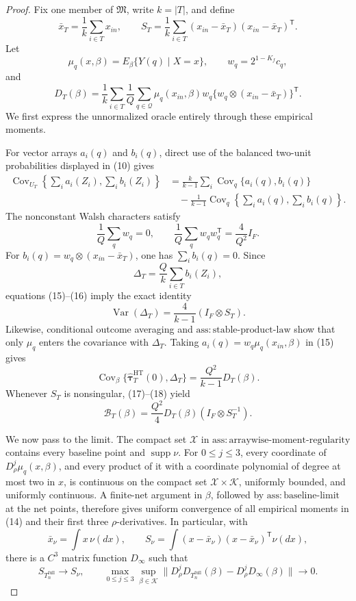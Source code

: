 \documentclass{article}
\begin{document}
\begin{proof}
Fix one member of \(\mathfrak M\), write \(k=|T|\), and define
\[
\bar x_T=\frac1k\sum_{i\in T}x_{in},
\qquad
S_T=\frac1k\sum_{i\in T}
(x_{in}-\bar x_T)(x_{in}-\bar x_T)^{\mathsf T}.
\]
Let
\[
\mu_q(x,\beta)=E_\beta\{Y(q)\mid X=x\},
\qquad w_q=2^{1-K_f}c_q,
\]
and
\[
D_T(\beta)
=\frac1k\sum_{i\in T}\frac1Q\sum_{q\in\mathcal Q}
\mu_q(x_{in},\beta)w_q
\{w_q\otimes(x_{in}-\bar x_T)\}^{\mathsf T}.
\tag{14}
\]
We first express the unnormalized oracle entirely through these empirical moments.

For vector arrays \(a_i(q)\) and \(b_i(q)\), direct use of the balanced two-unit probabilities displayed in (10) gives
\[
\begin{aligned}
\operatorname{Cov}_{U_T}\!\left\{\sum_i a_i(Z_i),\sum_i b_i(Z_i)\right\}
&=\frac{k}{k-1}\sum_i\operatorname{Cov}_q\{a_i(q),b_i(q)\}\\
&\quad-\frac1{k-1}
\operatorname{Cov}_q\!\left\{\sum_i a_i(q),\sum_i b_i(q)\right\}.
\end{aligned}
\tag{15}
\]
The nonconstant Walsh characters satisfy
\[
\frac1Q\sum_qw_q=0,
\qquad
\frac1Q\sum_qw_qw_q^{\mathsf T}=\frac4{Q^2}I_F.
\tag{16}
\]
For \(b_i(q)=w_q\otimes(x_{in}-\bar x_T)\), one has \(\sum_i b_i(q)=0\).  Since
\[
\Delta_T=\frac Qk\sum_{i\in T}b_i(Z_i),
\]
equations (15)--(16) imply the exact identity
\[
\operatorname{Var}(\Delta_T)
=\frac4{k-1}(I_F\otimes S_T).
\tag{17}
\]
Likewise, conditional outcome averaging and \(\mathrm{ass{:}stable\text{-}product\text{-}law}\) show that only \(\mu_q\) enters the covariance with \(\Delta_T\).  Taking \(a_i(q)=w_q\mu_q(x_{in},\beta)\) in (15) gives
\[
\operatorname{Cov}_\beta\{
\widehat{\boldsymbol\tau}^{\mathrm{HT}}_T(0),\Delta_T\}
=\frac{Q^2}{k-1}D_T(\beta).
\tag{18}
\]
Whenever \(S_T\) is nonsingular, (17)--(18) yield
\[
\mathcal B_T(\beta)
=\frac{Q^2}{4}D_T(\beta)(I_F\otimes S_T^{-1}).
\tag{19}
\]

We now pass to the limit.  The compact set \(\mathcal X\) in
\(\mathrm{ass{:}arraywise\text{-}moment\text{-}regularity}\) contains every baseline point and \(\operatorname{supp}\nu\).  For \(0\leq j\leq3\), every coordinate of
\(D_\rho^j\mu_q(x,\beta)\), and every product of it with a coordinate polynomial of degree at most two in \(x\), is continuous on the compact set
\(\mathcal X\times\mathcal K\), uniformly bounded, and uniformly continuous.  A finite-net argument in \(\beta\), followed by
\(\mathrm{ass{:}baseline\text{-}limit}\) at the net points, therefore gives uniform convergence of all empirical moments in (14) and their first three \(\rho\)-derivatives.  In particular, with
\[
\bar x_\nu=\int x\,\nu(dx),
\qquad
S_\nu=\int(x-\bar x_\nu)(x-\bar x_\nu)^{\mathsf T}\nu(dx),
\]
there is a \(C^3\) matrix function \(D_\infty\) such that
\[
S_{T_n^{\mathrm{full}}}\to S_\nu,
\qquad
\max_{0\leq j\leq3}\sup_{\beta\in\mathcal K}
\|D_\rho^jD_{T_n^{\mathrm{full}}}(\beta)
-D_\rho^jD_\infty(\beta)\|\to0.
\tag{20}
\]


\end{proof}
\end{document}
